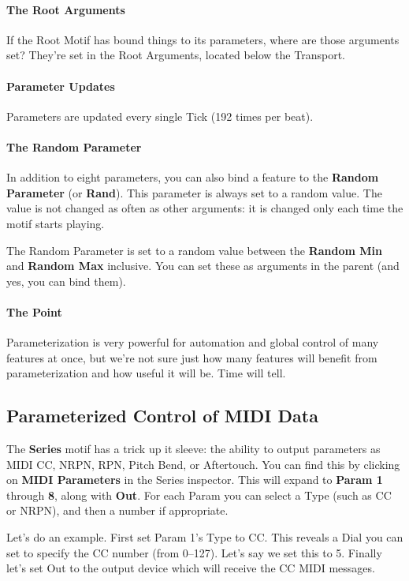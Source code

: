 \documentclass[twoside,10pt]{article}
\begin{document}
\paragraph{The Root Arguments}  If the Root Motif has bound things to its parameters, where are those arguments set?  They're set in the Root Arguments, located below the Transport.

\paragraph{Parameter Updates}  Parameters are updated every single Tick (192 times per beat).

\paragraph{The Random Parameter}  In addition to eight parameters, you can also bind a feature to the {\bf Random Parameter} (or {\bf Rand}).  This parameter is always set to a random value.  The value is not changed as often as other arguments: it is changed only each time the motif starts playing.

The Random Parameter is set to a random value between the {\bf Random Min} and {\bf Random Max} inclusive.  You can set these as arguments in the parent (and yes, you can bind them).  

\paragraph{The Point}  Parameterization is very powerful for automation and global control of many features at once, but we're not sure just how many features will benefit from parameterization and how useful it will be.    Time will tell.

\subsection{Parameterized Control of MIDI Data}
\label{mididata}

The {\bf Series} motif has a trick up it sleeve: the ability to output parameters as MIDI CC, NRPN, RPN, Pitch Bend, or Aftertouch. You can find this by clicking on {\bf MIDI Parameters} in the Series inspector.  This will expand to {\bf Param 1} through {\bf 8}, along with {\bf Out}.  For each Param you can select a Type (such as CC or NRPN), and then a number if appropriate.  

Let's do an example.  First set Param 1's Type to CC.  This reveals a Dial you can set to specify the CC number (from 0--127).  Let's say we set this to 5.  Finally let's set Out to the output device which will receive the CC MIDI messages.
\end{document}
